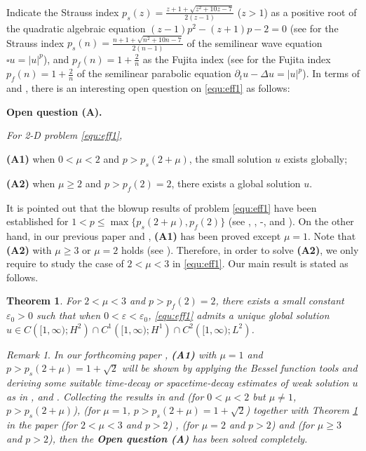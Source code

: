 \documentclass[11pt,twoside]{article}
\newcommand{\ve}{\varepsilon}
\newcommand{\f}{\frac}
\theoremstyle{plain}
\newtheorem{theorem}{Theorem}[section]
\theoremstyle{definition}
\theoremstyle{remark}
\newtheorem{remark}{Remark}[section]
\numberwithin{equation}{section}
\begin{document}
Indicate the Strauss index $p_s(z)=\f{z+1+\sqrt{z^2+10z-7}}{2(z-1)}$ ($z>1$)
as a positive root of the quadratic  algebraic equation
$(z-1)p^2-(z+1)p-2=0$ (see \cite{Strauss} for the Strauss index $p_s(n)=\f{n+1+\sqrt{n^2+10n-7}}{2(n-1)}$ of the semilinear wave equation
$\square u=|u|^p$), and $p_f(n)=1+\f{2}{n}$ as the Fujita index
(see \cite{Fuj} for the Fujita index $p_f(n)=1+\f{2}{n}$ of the semilinear parabolic equation
$\partial_t u-\Delta u=|u|^p$).
In terms of \cite{Rei1} and \cite{Imai}, there is an interesting open question on \eqref{equ:eff1} as follows:

{\bf Open question (A).} {\it For 2-D problem \eqref{equ:eff1},

{\bf (A1)} when $0<\mu<2$ and $p>p_s(2+\mu)$, the small solution $u$ exists globally;

{\bf (A2)} when $\mu\ge 2$ and $p>p_f(2)=2$, there exists a global solution $u$.
}

It is pointed out that the blowup results of problem \eqref{equ:eff1} have been established for
$1<p\le \max\{p_s(2+\mu), p_f(2)\}$ (see \cite{IS}, \cite{LTW}, \cite{PR-0}-\cite{PR-1}, \cite{TL2} and \cite{W1}).
On the other hand, in our previous paper \cite{LWY} and \cite{HLWY},
{\bf (A1)} has been proved except $\mu=1$. Note that {\bf (A2)} with  $\mu\ge 3$ or $\mu=2$
holds (see \cite{DA, Rei1}). Therefore, in order to solve {\bf (A2)}, we only require to
study the case of $2<\mu<3$ in \eqref{equ:eff1}.
Our main result is stated as follows.
\begin{theorem}\label{YH-1}
For $2<\mu<3$ and $p>p_{f}(2)=2$, there exists a small constant $\varepsilon_0>0$ such that when $0<\ve<\ve_0$,
\eqref{equ:eff1} admits a unique global solution $u\in C\left([1, \infty) ; H^{2}\right) \cap C^{1}\left([1, \infty) ; H^{1}\right)\cap C^{2}\left([1, \infty) ; L^{2}\right)$.
\end{theorem}

\begin{remark}\label{RE-1}
{\it In our forthcoming  paper \cite{HLWY-1},
{\bf (A1)} with $\mu=1$ and $p>p_s(2+\mu)=1+\sqrt{2}$  will be shown by applying
the Bessel function tools and deriving some suitable time-decay or spacetime-decay estimates of weak solution $u$
as in \cite{DA-0}, \cite{HLWY}  and \cite{LWY}.
Collecting the results in \cite{LWY} and \cite{HLWY} (for $0<\mu<2$ but $\mu\not=1$, $p>p_s(2+\mu)$), \cite{HLWY-1}
 (for $\mu=1$, $p>p_s(2+\mu)=1+\sqrt{2}$) together with
Theorem \ref{YH-1} in the paper (for $2<\mu<3$ and $p>2$) , \cite[Theorem 2]{Rei1}  (for $\mu=2$ and $p>2$)
and \cite[Theorem 2]{DA} (for $\mu\ge 3$ and $p>2$),
then the {\bf Open question (A)} has been solved completely.}
\end{remark}
\end{document}
